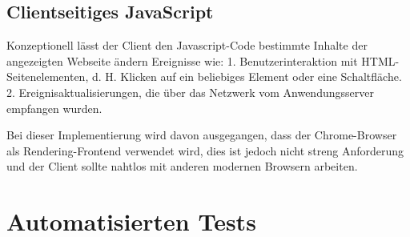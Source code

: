 \subsection{Clientseitiges JavaScript}
\label{sec:display_client:js}
Konzeptionell lässt der Client den Javascript-Code bestimmte Inhalte der angezeigten Webseite ändern
Ereignisse wie:
1. Benutzerinteraktion mit HTML-Seitenelementen, d. H. Klicken auf ein beliebiges Element oder eine Schaltfläche.
2. Ereignisaktualisierungen, die über das Netzwerk vom Anwendungsserver empfangen wurden.

Bei dieser Implementierung wird davon ausgegangen, dass der Chrome-Browser als Rendering-Frontend verwendet wird, dies ist jedoch nicht streng
Anforderung und der Client sollte nahtlos mit anderen modernen Browsern arbeiten.




\section{Automatisierten Tests}
\label{sec:testing}